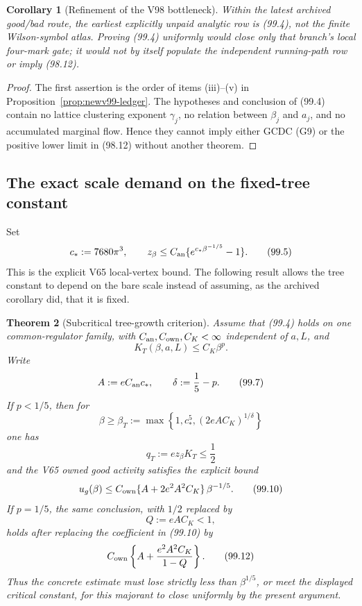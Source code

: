 \documentclass[11pt,oneside]{article}
\newtheorem{theorem}{Theorem}[section]
\newtheorem{corollary}[theorem]{Corollary}
\theoremstyle{definition}
\theoremstyle{remark}
\begin{document}
\begin{corollary}[Refinement of the V98 bottleneck]
\label{cor:newv99-refinement}
Within the latest archived good/bad route, the earliest explicitly
unpaid analytic row is (99.4), not the finite Wilson-symbol atlas.
Proving (99.4) uniformly would close only that branch's local
four-mark gate; it would not by itself populate the independent
running-path row or imply (98.12).
\end{corollary}

\begin{proof}
The first assertion is the order of items (iii)--(v) in
Proposition~\ref{prop:newv99-ledger}.  The hypotheses and conclusion
of (99.4) contain no lattice clustering exponent \(\gamma_j\), no
relation between \(\beta_j\) and \(a_j\), and no accumulated
marginal flow.  Hence they cannot imply either GCDC (G9) or the
positive lower limit in (98.12) without another theorem.
\end{proof}

\subsection{The exact scale demand on the fixed-tree constant}

Set
\[
 c_*:=7680\pi^3,\qquad
 z_\beta\le C_{\rm an}\{e^{c_*\beta^{-1/5}}-1\}.     \tag{99.5}
\]
This is the explicit V65 local-vertex bound.  The following result
allows the tree constant to depend on the bare scale instead of
assuming, as the archived corollary did, that it is fixed.

\begin{theorem}[Subcritical tree-growth criterion]
\label{thm:newv99-tree-growth}
Assume that (99.4) holds on one common-regulator family, with
\(C_{\rm an},C_{\rm own},C_K<\infty\) independent of \(a,L\), and
\[
 K_T(\beta,a,L)\le C_K\beta^p.                      \tag{99.6}
\]
Write
\[
 A:=eC_{\rm an}c_*,\qquad
 \delta:=\frac15-p.                                 \tag{99.7}
\]
If \(p<1/5\), then for
\[
 \beta\ge\beta_T:=
 \max\left\{1,c_*^5,
       (2eA C_K)^{1/\delta}\right\}                 \tag{99.8}
\]
one has
\[
 q_T:=e z_\beta K_T\le\frac12                       \tag{99.9}
\]
and the V65 owned good activity satisfies the explicit bound
\[
 u_g(\beta)\le
 C_{\rm own}\{A+2e^2A^2C_K\}\,\beta^{-1/5}.         \tag{99.10}
\]
If \(p=1/5\), the same conclusion, with \(1/2\) replaced by
\[
 Q:=eAC_K<1,                                        \tag{99.11}
\]
holds after replacing the coefficient in (99.10) by
\[
 C_{\rm own}\left\{
 A+\frac{e^2A^2C_K}{1-Q}\right\}.                   \tag{99.12}
\]
Thus the concrete estimate must lose strictly less than
\(\beta^{1/5}\), or meet the displayed critical constant, for this
majorant to close uniformly by the present argument.
\end{theorem}
\end{document}
